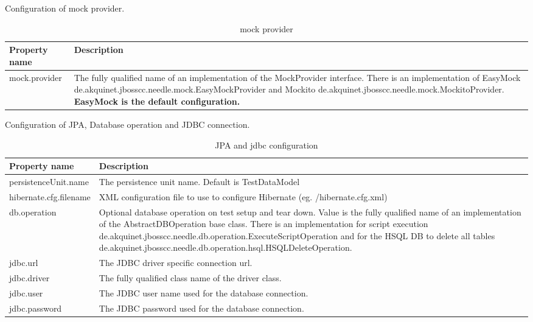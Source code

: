 \parskip 14pt
\parindent 0pt
Configuration of mock provider.

\begin{table}[H]
\centering
\begin{tabular}{p{6cm}p{11cm}} \toprule 
    \textbf{Property name} & \textbf{Description} \\ \midrule
    mock.provider & The fully qualified name of an implementation of the MockProvider interface. There is an implementation of EasyMock de.akquinet.jbosscc.needle.mock.EasyMockProvider and Mockito de.akquinet.jbosscc.needle.mock.MockitoProvider. \textbf{EasyMock is the default configuration.}  \\
\bottomrule
\end{tabular}
\caption{mock provider}
\end{table}


\parskip 14pt
\parindent 0pt
Configuration of JPA, Database operation and JDBC connection.

\begin{table}[H]
\centering
\begin{tabular}{p{6cm}p{11cm}} \toprule 
    \textbf{Property name} & \textbf{Description} \\ \midrule
    persistenceUnit.name & The persistence unit name. Default is TestDataModel  \\
    hibernate.cfg.filename & XML configuration file to use to configure Hibernate (eg. /hibernate.cfg.xml)  \\
    db.operation & Optional database operation on test setup and tear down. Value is the fully qualified name of an implementation of the AbstractDBOperation base class. 
There is an implementation for script execution de.akquinet.jbosscc.needle.db.operation.ExecuteScriptOperation and for the  HSQL DB to delete all tables de.akquinet.jbosscc.needle.db.operation.hsql.HSQLDeleteOperation.    \\
    jdbc.url & The JDBC driver specific connection url.  \\
    jdbc.driver & The fully qualified class name of the driver class.  \\
    jdbc.user &  The JDBC user name used for the database connection.  \\
    jdbc.password & The JDBC password used for the database connection.  \\
\bottomrule 
\end{tabular}
\caption{JPA and jdbc configuration}
\end{table}

